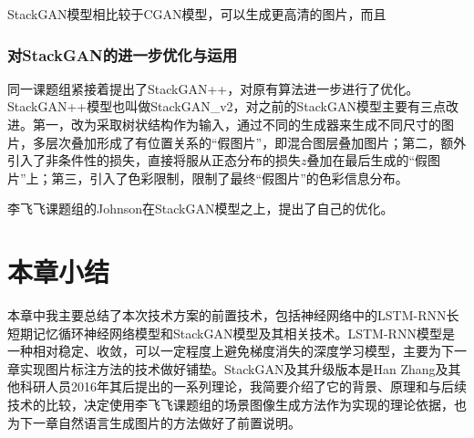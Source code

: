   StackGAN模型相比较于CGAN模型，可以生成更高清的图片，而且

\subsubsection{对StackGAN的进一步优化与运用}
同一课题组紧接着提出了StackGAN++，对原有算法进一步进行了优化。StackGAN++模型也叫做StackGAN\_v2，对之前的StackGAN模型主要有三点改进。第一，改为采取树状结构作为输入，通过不同的生成器来生成不同尺寸的图片，多层次叠加形成了有位置关系的“假图片”，即混合图层叠加图片；第二，额外引入了非条件性的损失，直接将服从正态分布的损失$z$叠加在最后生成的“假图片”上；第三，引入了色彩限制，限制了最终“假图片”的色彩信息分布。

李飞飞课题组的Johnson在StackGAN模型之上，提出了自己的优化。

\section{本章小结}
本章中我主要总结了本次技术方案的前置技术，包括神经网络中的LSTM-RNN长短期记忆循环神经网络模型和StackGAN模型及其相关技术。LSTM-RNN模型是一种相对稳定、收敛，可以一定程度上避免梯度消失的深度学习模型，主要为下一章实现图片标注方法的技术做好铺垫。StackGAN及其升级版本是Han Zhang及其他科研人员2016年其后提出的一系列理论，我简要介绍了它的背景、原理和与后续技术的比较，决定使用李飞飞课题组的场景图像生成方法作为实现的理论依据，也为下一章自然语言生成图片的方法做好了前置说明。